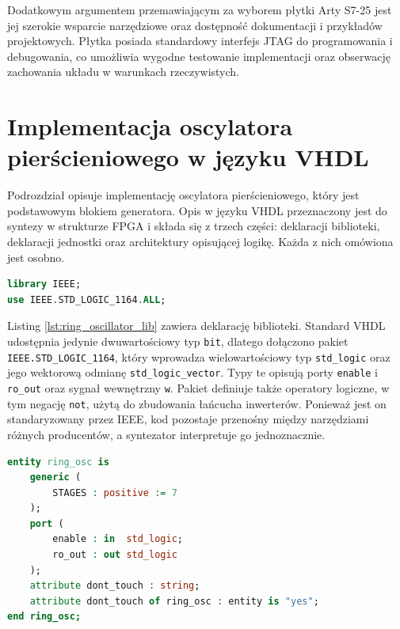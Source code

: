 Dodatkowym argumentem przemawiającym za wyborem płytki Arty S7-25 jest jej
szerokie wsparcie narzędziowe oraz dostępność dokumentacji i przykładów
projektowych. Płytka posiada standardowy interfejs JTAG do programowania
i debugowania, co umożliwia wygodne testowanie implementacji oraz
obserwację zachowania układu w warunkach rzeczywistych.

\section{Implementacja oscylatora pierścieniowego w języku VHDL}

Podrozdział opisuje implementację oscylatora pierścieniowego, który jest
podstawowym blokiem generatora. Opis w języku VHDL przeznaczony jest do syntezy
w strukturze FPGA i składa się z trzech części: deklaracji biblioteki,
deklaracji jednostki oraz architektury opisującej logikę. Każda z nich
omówiona jest osobno.

\begin{lstlisting}[language=VHDL,
caption={Standardowe biblioteki VHDL (ring\_oscillator.vhdl)},
label={lst:ring_oscillator_lib}]
library IEEE;
use IEEE.STD_LOGIC_1164.ALL;
\end{lstlisting}

Listing \ref{lst:ring_oscillator_lib} zawiera deklarację biblioteki. Standard
VHDL udostępnia jedynie dwuwartościowy typ \texttt{bit}, dlatego dołączono
pakiet \texttt{IEEE.STD\_LOGIC\_1164}, który wprowadza wielowartościowy typ
\texttt{std\_logic} oraz jego wektorową odmianę \texttt{std\_logic\_vector}.
Typy te opisują porty \texttt{enable} i \texttt{ro\_out} oraz sygnał
wewnętrzny \texttt{w}. Pakiet definiuje także operatory logiczne, w tym negację \texttt{not}, użytą
do zbudowania łańcucha inwerterów. Ponieważ jest on standaryzowany przez IEEE,
kod pozostaje przenośny między narzędziami różnych producentów, a syntezator
interpretuje go jednoznacznie.

\begin{lstlisting}[language=VHDL,
caption={Moduł oscylatora pierścieniowego (ring\_oscillator.vhdl)},
label={lst:ring_oscillator_entity}]
entity ring_osc is
    generic (
        STAGES : positive := 7
    );
    port (
        enable : in  std_logic;
        ro_out : out std_logic
    );
    attribute dont_touch : string;
    attribute dont_touch of ring_osc : entity is "yes";
end ring_osc;
\end{lstlisting}

